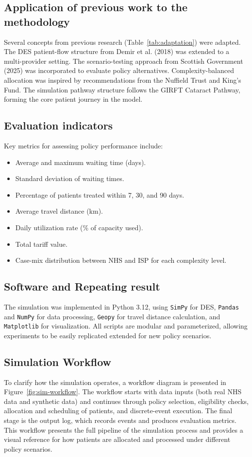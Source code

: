 \documentclass[ %
                    author={Nattanan Nawakitbamrung},
                supervisor={Dr. Sébastien Rochat},
                    degree={MSc},
                     title={Developing and Evaluating the Impact of a Single Patient Treatment List (PTL) for an NHS Integrated Care System},
                  subtitle={},
                      type={},
                      year={2025}]{dissertation}
\begin{document}
\subsection{Application of previous work to the methodology}
Several concepts from previous research (Table~\ref{tab:adaptation}) were adapted. The DES patient-flow structure from Demir et al. (2018) was extended to a multi-provider setting. The scenario-testing approach from Scottish Government (2025) was incorporated to evaluate policy alternatives. Complexity-balanced allocation was inspired by recommendations from the Nuffield Trust and King’s Fund. The simulation pathway structure follows the GIRFT Cataract Pathway, forming the core patient journey in the model.

\subsection{Evaluation indicators}
Key metrics for assessing policy performance include: 
\begin{itemize}
    \item Average and maximum waiting time (days).
    \item Standard deviation of waiting times.
    \item Percentage of patients treated within 7, 30, and 90 days.
    \item Average travel distance (km).
    \item Daily utilization rate (\% of capacity used).
    \item Total tariff value.
    \item Case-mix distribution between NHS and ISP for each complexity level.
\end{itemize}

\subsection{Software and Repeating result}
The simulation was implemented in Python 3.12, using \texttt{SimPy} for DES, \texttt{Pandas} and \texttt{NumPy} for data processing, \texttt{Geopy} for travel distance calculation, and \texttt{Matplotlib} for visualization. All scripts are modular and parameterized, allowing experiments to be easily replicated extended for new policy scenarios.

\subsection{Simulation Workflow}
To clarify how the simulation operates, a workflow diagram is presented in Figure~\ref{fig:sim-workflow}. The workflow starts with data inputs (both real NHS data and synthetic data) and continues through policy selection, eligibility checks, allocation and scheduling of patients, and discrete-event execution. 
The final stage is the output log, which records events and produces evaluation metrics. This workflow presents the full pipeline of the simulation process and provides a visual reference for how patients are allocated and processed under different policy scenarios.
\end{document}
